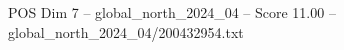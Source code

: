 \begin{textsample}{POS Dim 7 – global\_north\_2024\_04 – Score 11.00 – global\_north\_2024\_04/200432954.txt}
\end{textsample}
